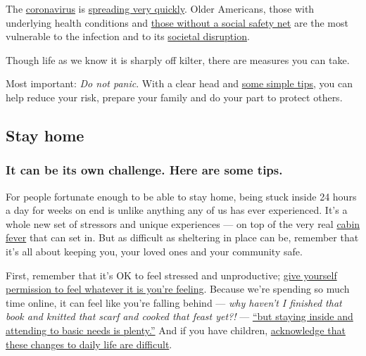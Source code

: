 The
\href{https://www.nytimes3xbfgragh.onion/2020/04/03/technology/coronavirus-masks-shortage.html}{coronavirus}
is
\href{https://www.nytimes3xbfgragh.onion/interactive/2020/world/asia/china-coronavirus-contain.html}{spreading
very quickly}. Older Americans, those with underlying health conditions
and
\href{https://www.nytimes3xbfgragh.onion/2020/03/10/us/coronavirus-homeless.html?smtyp=cur\&smid=tw-nytimes}{those
without a social safety net} are the most vulnerable to the infection
and to its
\href{https://www.nytimes3xbfgragh.onion/live/2020/coronavirus-usa-03-16}{societal
disruption}.

Though life as we know it is sharply off kilter, there are measures you
can take.

Most important: \emph{Do not panic}. With a clear head and
\href{https://www.nytimes3xbfgragh.onion/2020/03/10/us/politics/coronavirus-guidelines.html}{some
simple tips}, you can help reduce your risk, prepare your family and do
your part to protect others.

\hypertarget{stay-home}{%
\subsection{Stay home}\label{stay-home}}

\hypertarget{it-can-be-its-own-challenge-here-are-some-tips}{%
\subsubsection{It can be its own challenge. Here are some
tips.}\label{it-can-be-its-own-challenge-here-are-some-tips}}

For people fortunate enough to be able to stay home, being stuck inside
24 hours a day for weeks on end is unlike anything any of us has ever
experienced. It's a whole new set of stressors and unique experiences
--- on top of the very real
\href{https://www.nytimes3xbfgragh.onion/2020/03/25/business/coronavirus-families-cabin-fever.html}{cabin
fever} that can set in. But as difficult as sheltering in place can be,
remember that it's all about keeping you, your loved ones and your
community safe.

First, remember that it's OK to feel stressed and unproductive;
\href{https://www.nytimes3xbfgragh.onion/2020/03/23/smarter-living/coronavirus-coping-tips.html}{give
yourself permission to feel whatever it is you're feeling}. Because
we're spending so much time online, it can feel like you're falling
behind --- \emph{why haven't I finished that book and knitted that scarf
and cooked that feast yet?!} ---
\href{https://www.nytimes3xbfgragh.onion/2020/04/01/style/productivity-coronavirus.html}{``but
staying inside and attending to basic needs is plenty.''} And if you
have children,
\href{https://www.nytimes3xbfgragh.onion/2020/04/01/parenting/coronavirus-help-anxious-kid.html}{acknowledge
that these changes to daily life are difficult}.


